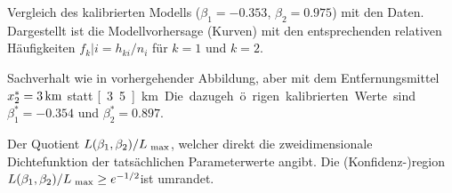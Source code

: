 \documentclass[a4paper]{foils}
\begin{document}
\begin{landscape}
\begin{center}
\newpage
\vspace{0em}
\parbox{1.3\textwidth}{Vergleich des kalibrierten Modells
($\beta_1=-0.353$, $\beta_2=0.975$) 
mit den Daten. Dargestellt ist die Modellvorhersage (Kurven) mit den
entsprechenden relativen H\"aufigkeiten $f_k|i=h_{ki}/n_i$ f\"ur $k=1$
und $k=2$.
}

\newpage
\vspace{0em}
\parbox{1.3\textwidth}{Sachverhalt wie in
vorhergehender Abbildung, aber mit dem 
Entfernungsmittel $x^*_2=\unit[3]{km}$ statt \unit[3.5]{km}.
Die dazugeh\"origen kalibrierten Werte sind $\beta^*_1=-0.354$ und
$\beta^*_2=0.897$. 
}

\newpage
\vspace{-1em}
\vspace{-1em}
\parbox{1.1\textwidth}{Der Quotient
$L(\beta_1,\beta_2)/L_{{\mbox{ {\scriptsize \hspace{-0.2ex}max}}}}$, welcher direkt die zweidimensionale
Dichtefunktion der tats\"achlichen Parameterwerte angibt. 
Die (Konfidenz-)region $L(\beta_1,\beta_2)/L_{{\mbox{ {\scriptsize \hspace{-0.2ex}max}}}}\ge e^{-1/2}$ist 
umrandet.
}



\end{center}
\end{landscape}
\end{document}
